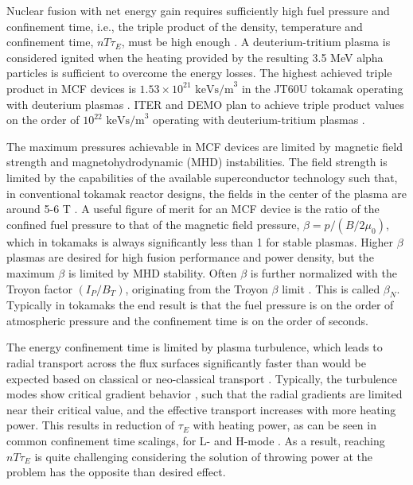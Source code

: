 \documentclass[a4paper, twoside, final, 12pt]{article}
\begin{document}
Nuclear fusion with net energy gain requires sufficiently high fuel pressure and confinement time, i.e., the triple product of the density, temperature and confinement time, $nT\tau_E$,  must be high enough \cite{Lawson_1957}. A deuterium-tritium plasma is considered ignited when the heating provided by the resulting 3.5 MeV alpha particles is sufficient to overcome the energy losses. 
The highest achieved triple product in MCF devices is $1.53\times 10^{21}\text{ keVs/m}^3$ in the JT60U tokamak operating with deuterium plasmas \cite{history}. ITER and DEMO plan to achieve triple product values on the order of $10^{22}\text{ keVs/m}^3$ operating with deuterium-tritium plasmas \cite{EUROfusionroadmap}.

The maximum pressures achievable in MCF devices are limited by magnetic field strength and magnetohydrodynamic (MHD) instabilities.
The field strength is limited by the capabilities of the available superconductor technology such that, in conventional tokamak reactor designs, the fields in the center of the plasma are around 5-6 T \cite{zohm_use_2019}. A useful figure of merit for an MCF device is the ratio of the confined fuel pressure to that of the magnetic field pressure, $\beta = p / (B/2\mu_0)$, which in tokamaks is always significantly less than 1 for stable plasmas. Higher $\beta$ plasmas are desired for high fusion performance and power density, but the maximum $\beta$ is limited by MHD stability. Often $\beta$ is further normalized with the Troyon factor $(I_P / B_T)$, originating from the Troyon $\beta$ limit \cite{Troyon_1988}. This is called $\beta_N$. Typically in tokamaks the end result is that the fuel pressure is on the order of atmospheric pressure and the confinement time is on the order of seconds. 


The energy confinement time is limited by plasma turbulence, which leads to radial transport across the flux surfaces significantly faster than would be expected based on classical or neo-classical transport \cite{Ikeda_2007}.
Typically, the turbulence modes show critical gradient behavior \cite{Ikeda_2007}, such that the radial gradients are limited near their critical value, and the effective transport increases with more heating power.
This results in reduction of $\tau_E$ with heating power, as can be seen in common confinement time scalings, for L- and H-mode \cite{Ikeda_2007}. As a result, reaching $nT\tau_E$ is quite challenging considering the solution of throwing power at the problem has the opposite than desired effect.
\end{document}
